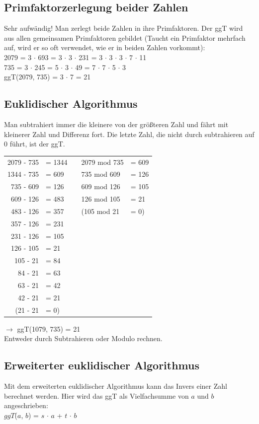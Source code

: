 \subsection{Primfaktorzerlegung beider Zahlen}
Sehr aufwändig! Man zerlegt beide Zahlen in ihre Primfaktoren. Der ggT wird aus allen gemeinsamen Primfaktoren gebildet (Taucht ein Primfaktor mehrfach auf, wird er so oft verwendet, wie er in beiden Zahlen vorkommt): \\
2079 = 3 $\cdot$ 693 = 3 $\cdot$ 3 $\cdot$ 231 = 3 $\cdot$ 3 $\cdot$ 3 $\cdot$ 7 $\cdot$ 11 \\
735 = 3 $\cdot$ 245 = 5 $\cdot$ 3 $\cdot$ 49 = 7 $\cdot$ 7 $\cdot$ 5 $\cdot$ 3 \\
ggT(2079, 735) = 3 $\cdot$ 7 = 21

\subsection{Euklidischer Algorithmus}
Man subtrahiert immer die kleinere von der größteren Zahl und fährt mit kleinerer Zahl und Differenz fort. Die letzte Zahl, die nicht durch subtrahieren auf 0 führt, ist der ggT.
\begin{tabular}{rllll}
	2079 - 735 & = 1344 &  & 2079 mod 735 & = 609 \\
	1344 - 735 & = 609 &  & 735 mod 609 & = 126 \\
	735 - 609 & = 126 &  & 609 mod 126 & = 105 \\
	609 - 126 & = 483 &  & 126 mod 105 & = 21 \\
	483 - 126 & = 357 &  & (105 mod 21 & = 0) \\
	357 - 126 & = 231 &  &  &  \\
	231 - 126 & = 105 &  &  &  \\
	126 - 105 & = 21 &  &  &  \\
	105 - 21 & = 84 &  &  &  \\
	84 - 21 & = 63 &  &  &  \\
	63 - 21 & = 42 &  &  &  \\
	42 - 21 & = 21 &  &  &  \\
	(21 - 21 & = 0) &  &  &  \\
\end{tabular}

$\rightarrow$ ggT(1079, 735) = 21 \\
Entweder durch Subtrahieren oder Modulo rechnen.

\subsection{Erweiterter euklidischer Algorithmus}
Mit dem erweiterten euklidischer Algorithmus kann das Invers einer Zahl berechnet werden. Hier wird das ggT als Vielfachsumme von $a$ und $b$ angeschrieben: \\
$ggT$($a$, $b$) = $s$ $\cdot$ $a$ + $t$ $\cdot$ $b$

